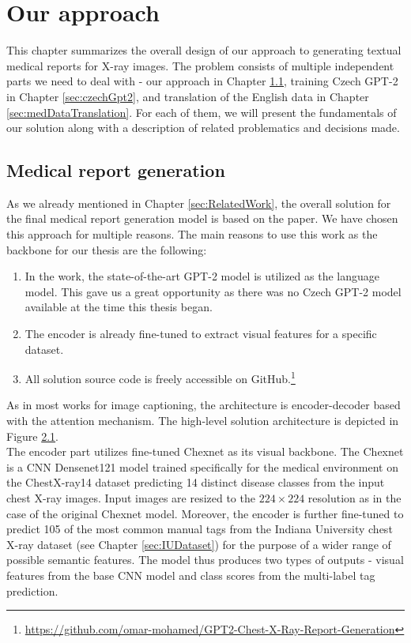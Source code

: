 \chapter{Our approach}
This chapter summarizes the overall design of our approach to generating textual medical reports for X-ray images. The problem consists of multiple independent parts we need to deal with - our approach in Chapter \ref{sec:ourApproach}, training Czech GPT-2 in Chapter \ref{sec:czechGpt2}, and translation of the English data in Chapter \ref{sec:medDataTranslation}. For each of them, we will present the fundamentals of our solution along with a description of related problematics and decisions made.

\section{Medical report generation}
\label{sec:ourApproach}
As we already mentioned in Chapter \ref{sec:RelatedWork}, the overall solution for the final medical report generation model is based on the \citet{alfarghaly2021automated} paper. We have chosen this approach for multiple reasons. The main reasons to use this work as the backbone for our thesis are the following:
\begin{enumerate}
	\item In the work, the state-of-the-art GPT-2 model is utilized as the language model. This gave us a great opportunity as there was no Czech GPT-2 model available at the time this thesis began.
	\item The encoder is already fine-tuned to extract visual features for a specific dataset.
	\item All solution source code is freely accessible on GitHub.\footnote[1]{\url{https://github.com/omar-mohamed/GPT2-Chest-X-Ray-Report-Generation}}
\end{enumerate}

As in most works for image captioning, the architecture is encoder-decoder based with the attention mechanism. The high-level solution architecture is depicted in Figure \hyperref[fig01:OmarArchitecutre]{2.1}.\\

The encoder part utilizes fine-tuned Chexnet\citep{rajpurkar2017chexnet} as its visual backbone. The Chexnet is a CNN Densenet121 model trained specifically for the medical environment on the ChestX-ray14\citep{wang2017chestx} dataset predicting 14 distinct disease classes from the input chest X-ray images. Input images are resized to the $224 \times 224$ resolution as in the case of the original Chexnet model. Moreover, the encoder is further fine-tuned to predict 105 of the most common manual tags from the Indiana University chest X-ray dataset (see Chapter \ref{sec:IUDataset}) for the purpose of a wider range of possible semantic features. The model thus produces two types of outputs - visual features from the base CNN model and class scores from the multi-label tag prediction.\\


